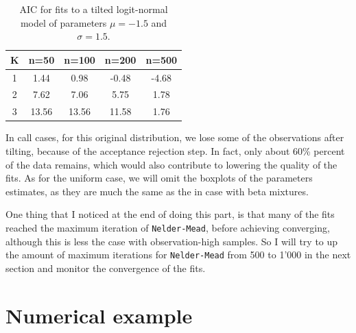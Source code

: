 



\begin{table}
\centering
\begin{tabular}{ |c|c|c|c|c| } 
\hline
K & n=50 & n=100 & n=200 & n=500\\
\hline
1 & 1.44 & 0.98 & -0.48 & -4.68\\
\hline
2 & 7.62 & 7.06 & 5.75 & 1.78\\
\hline
3 & 13.56 & 13.56 & 11.58 & 1.76\\
\hline
\end{tabular}
\caption{AIC for fits to a tilted logit-normal model of parameters $\mu=-1.5$ and $\sigma=1.5$. }
\label{table:logitnormal_aic}
\end{table}

In call cases, for this original distribution, we lose some of the observations after tilting, because of the acceptance rejection step. In fact, only about 60\% percent of the data remains, which would also contribute to lowering the quality of the fits. As for the uniform case, we will omit the boxplots of the parameters estimates, as they are much the same as the in case with beta mixtures.

One thing that I noticed at the end of doing this part, is that many of the fits reached the maximum iteration of \texttt{Nelder-Mead}, before achieving converging, although this is less the case with observation-high samples. So I will try to up the amount of maximum iterations for \texttt{Nelder-Mead} from 500 to 1'000 in the next section and monitor the convergence of the fits.



\section{Numerical example}

